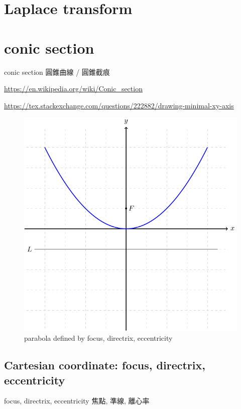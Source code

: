 \documentclass[
]{book}
\theoremstyle{definition}
\theoremstyle{definition}
\theoremstyle{definition}
\theoremstyle{definition}
\theoremstyle{remark}
\begin{document}
\chapter{Laplace transform}\label{laplace-transform}

\chapter{conic section}\label{conic-section}

\begin{CJK}{UTF8}{bsmi}
conic section 圓錐曲線 / 圓錐截痕
\end{CJK}

\url{https://en.wikipedia.org/wiki/Conic_section}

\url{https://tex.stackexchange.com/questions/222882/drawing-minimal-xy-axis}

\begin{figure}
\includegraphics[width=0.75\linewidth]{202402252333-conic-section_files/figure-latex/unnamed-chunk-1-1} \caption{parabola defined by focus, directrix, eccentricity}\label{fig:unnamed-chunk-1}
\end{figure}

\section{Cartesian coordinate: focus, directrix, eccentricity}\label{cartesian-coordinate-focus-directrix-eccentricity}

\begin{CJK}{UTF8}{bsmi}
focus, directrix, eccentricity 焦點, 準線, 離心率
\end{CJK}
\end{document}
